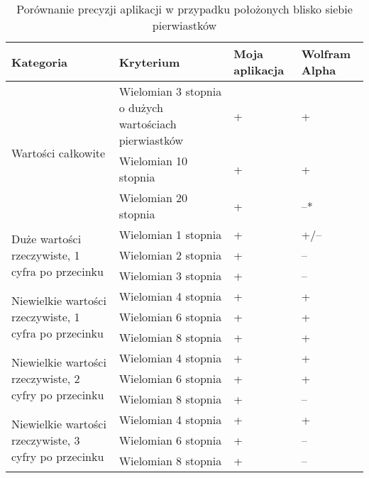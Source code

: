 \begin{table}[H]
	\begin{tabular}{ |p{5cm}|p{5cm}|p{1.5cm}|p{1.5cm}| } 
		\hline
		Kategoria & Kryterium & Moja aplikacja & Wolfram Alpha \\
		\hline
		\multirow{3}{*}{Wartości całkowite}
		& Wielomian 3 stopnia o dużych wartościach pierwiastków & + & + \\
		& Wielomian 10 stopnia & + & + \\
		& Wielomian 20 stopnia & + & --* \\
		\hline
		\multirow{3}{12em}{Duże wartości rzeczywiste, 1 cyfra po przecinku}
		& Wielomian 1 stopnia & + & +/-- \\
		& Wielomian 2 stopnia & + & -- \\
		& Wielomian 3 stopnia & + & -- \\
		\hline
		\multirow{3}{14em}{Niewielkie wartości rzeczywiste, 1 cyfra po przecinku}
		& Wielomian 4 stopnia & + & + \\
		& Wielomian 6 stopnia & + & + \\
		& Wielomian 8 stopnia & + & + \\
		\hline
		\multirow{3}{14em}{Niewielkie wartości rzeczywiste, 2 cyfry po przecinku}
		& Wielomian 4 stopnia & + & + \\
		& Wielomian 6 stopnia & + & + \\
		& Wielomian 8 stopnia & + & -- \\
		\hline
		\multirow{3}{14em}{Niewielkie wartości rzeczywiste, 3 cyfry po przecinku}
		& Wielomian 4 stopnia & + & + \\
		& Wielomian 6 stopnia & + & -- \\
		& Wielomian 8 stopnia & + & -- \\
		\hline
	\end{tabular}
	\caption{Porównanie precyzji aplikacji w przypadku położonych blisko siebie pierwiastków}
\end{table}